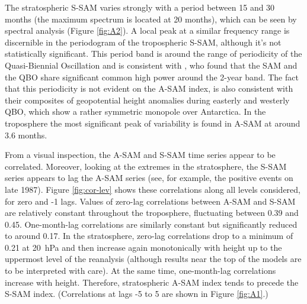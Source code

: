 \documentclass[smallextended]{svjour3}       %
\begin{document}
The stratospheric S\nobreakdash-SAM varies strongly with a period between 15 and 30 months (the maximum spectrum is located at 20 months), which can be seen by spectral analysis (Figure \ref{fig:A2}). A local peak at a similar frequency range is discernible in the periodogram of the tropospheric S\nobreakdash-SAM, although it's not statistically significant. This period band is around the range of periodicity of the Quasi-Biennial Oscillation \citep{baldwin2001b} and is consistent with \citep{vasconcellos2020}, who found that the SAM and the QBO share significant common high power around the 2-year band.
The fact that this periodicity is not evident on the A\nobreakdash-SAM index, is also consistent with their composites of geopotential height anomalies during easterly and westerly QBO, which show a rather symmetric monopole over Antarctica.
In the troposphere the most significant peak of variability is found in A\nobreakdash-SAM at around 3.6 months.

From a visual inspection, the A\nobreakdash-SAM and S\nobreakdash-SAM time series appear to be correlated.
Moreover, looking at the extremes in the stratosphere, the S\nobreakdash-SAM series appears to lag the A\nobreakdash-SAM series (see, for example, the positive events on late 1987).
Figure \ref{fig:cor-lev} shows these correlations along all levels considered, for zero and -1 lags.
Values of zero-lag correlations between A\nobreakdash-SAM and S\nobreakdash-SAM are relatively constant throughout the troposphere, fluctuating between 0.39 and 0.45.
One-month-lag correlations are similarly constant but significantly reduced to around 0.17.
In the stratosphere, zero-lag correlations drop to a minimum of 0.21 at 20~hPa and then increase again monotonically with height up to the uppermost level of the reanalysis (although results near the top of the models are to be interpreted with care).
At the same time, one-month-lag correlations increase with height.
Therefore, stratospheric A\nobreakdash-SAM index tends to precede the S\nobreakdash-SAM index.
(Correlations at lags -5 to 5 are shown in Figure \ref{fig:A1}.)
\end{document}
